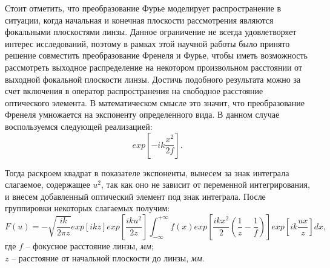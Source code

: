 {    Стоит отметить, что преобразование Фурье моделирует распространение в ситуации,
    когда начальная и конечная плоскости рассмотрения являются фокальными плоскостями линзы.
    Данное ограничение не всегда удовлетворяет интерес исследований,
    поэтому в рамках этой научной работы было принято решение совместить преобразование Френеля и Фурье,
    чтобы иметь возможность рассмотреть выходное распределение на некотором произвольном расстоянии от выходной фокальной плоскости линзы.
    Достичь подобного результата можно за счет включения в оператор распространения на свободное расстояние оптического элемента.
    В математическом смысле это значит, что преобразование Френеля умножается на экспоненту определенного вида.
    В данном случае воспользуемся следующей реализацией:
    \begin{equation*}
        exp[-ik \frac{x^2}{2f} ].
    \end{equation*}

    Тогда раскроем квадрат в показателе экспоненты, вынесем за знак интеграла слагаемое, содержащее $u^2$,
    так как оно не зависит от переменной интегрирования, и внесем добавленный оптический элемент под знак интеграла.
    После группировки некоторых слагаемых получим:
    \begin{equation*}
        F(u) = - \sqrt{\frac{ik}{2 \pi z}}exp[ikz] exp[{ \frac{iku^2}{2z} }] \int_{-\infty}^{+\infty}f(x) exp[\frac{ikx^2}{2}( \frac{1}{z} - \frac{1}{f})] exp[{ik \frac{ux}{z}}]dx,
    \end{equation*}
    \tab    где $f$ -- фокусное расстояние линзы,  \textit{мм};\\
    \tab \tab \hspace{-0.4cm}$z$ -- расстояние от начальной плоскости до линзы,  \textit{мм}.
    }\label{sec:обзор-теоретических-основ-для-ускоряющихся-пучков}
    \newpage

